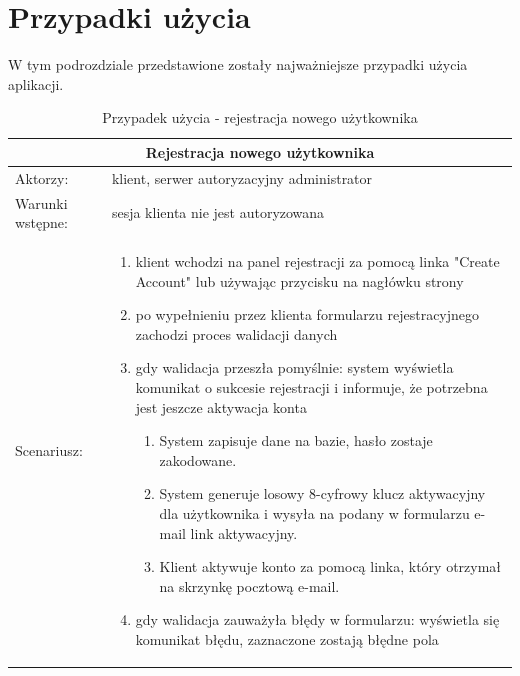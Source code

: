 \section{Przypadki użycia}

W tym podrozdziale przedstawione zostały najważniejsze przypadki użycia aplikacji.


\begin{table}[h!]
	
	\begin{tabular}{ |p{2cm}||p{13cm}|  }
		
		\hline
		\multicolumn{2}{|c|}{Rejestracja nowego użytkownika} \\
		\hline
		Aktorzy: &klient, serwer autoryzacyjny administrator\\
		\hline
		Warunki wstępne: & sesja klienta nie jest autoryzowana\\ 
		\hline
		Scenariusz: &
		\begin{enumerate}[leftmargin=0em]
			\item klient wchodzi na panel rejestracji za pomocą linka "Create Account" lub używając przycisku na nagłówku strony 
			
			\item po wypełnieniu przez klienta formularzu rejestracyjnego zachodzi proces walidacji danych
			
			\item gdy walidacja przeszła pomyślnie: system wyświetla komunikat o sukcesie rejestracji i informuje, że potrzebna jest jeszcze aktywacja konta
			
			\begin{enumerate}[leftmargin=2em]
				\item System zapisuje dane na bazie, hasło zostaje zakodowane.
				
				\item System generuje losowy 8-cyfrowy klucz aktywacyjny dla użytkownika i wysyła na podany w formularzu e-mail link aktywacyjny.
				
				\item Klient aktywuje konto za pomocą linka, który otrzymał na skrzynkę pocztową e-mail.
			\end{enumerate}
			
			\item gdy walidacja zauważyła błędy w formularzu: wyświetla się komunikat błędu, zaznaczone zostają błędne pola
		\end{enumerate}\\
		\hline
		
	\end{tabular}
	
	\caption{Przypadek użycia - rejestracja nowego użytkownika}
\end{table}

